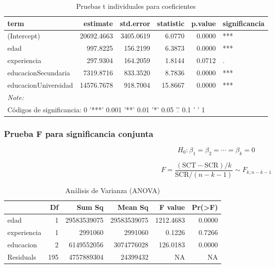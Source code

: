 \documentclass[
  oneside]{book}
\begin{document}
\begin{table}
\centering
\caption{\label{tab:prueba-t}Pruebas t individuales para coeficientes}
\centering
\begin{tabular}[t]{l|r|r|r|r|l}
\hline
term & estimate & std.error & statistic & p.value & significancia\\
\hline
(Intercept) & 20692.4663 & 3405.0619 & 6.0770 & 0.0000 & ***\\
\hline
edad & 997.8225 & 156.2199 & 6.3873 & 0.0000 & ***\\
\hline
experiencia & 297.9304 & 164.2059 & 1.8144 & 0.0712 & .\\
\hline
educacionSecundaria & 7319.8716 & 833.3520 & 8.7836 & 0.0000 & ***\\
\hline
educacionUniversidad & 14576.7678 & 918.7004 & 15.8667 & 0.0000 & ***\\
\hline
\multicolumn{6}{l}{\rule{0pt}{1em}\textit{Note: }}\\
\multicolumn{6}{l}{\rule{0pt}{1em}Códigos de significancia: 0 '***' 0.001 '**' 0.01 '*' 0.05 '.' 0.1 ' ' 1}\\
\end{tabular}
\end{table}

\subsubsection{Prueba F para significancia conjunta}\label{prueba-f-para-significancia-conjunta}

\begin{equation}
H_0: \beta_1 = \beta_2 = \cdots = \beta_k = 0
\end{equation}

\begin{equation}
F = \frac{(\text{SCT} - \text{SCR})/k}{\text{SCR}/(n-k-1)} \sim F_{k,n-k-1}
\end{equation}

\begin{table}
\centering
\caption{\label{tab:prueba-f}Análisis de Varianza (ANOVA)}
\centering
\begin{tabular}[t]{l|r|r|r|r|r}
\hline
  & Df & Sum Sq & Mean Sq & F value & Pr(>F)\\
\hline
edad & 1 & 29583539075 & 29583539075 & 1212.4683 & 0.0000\\
\hline
experiencia & 1 & 2991060 & 2991060 & 0.1226 & 0.7266\\
\hline
educacion & 2 & 6149552056 & 3074776028 & 126.0183 & 0.0000\\
\hline
Residuals & 195 & 4757889304 & 24399432 & NA & NA\\
\hline
\end{tabular}
\end{table}
\end{document}
